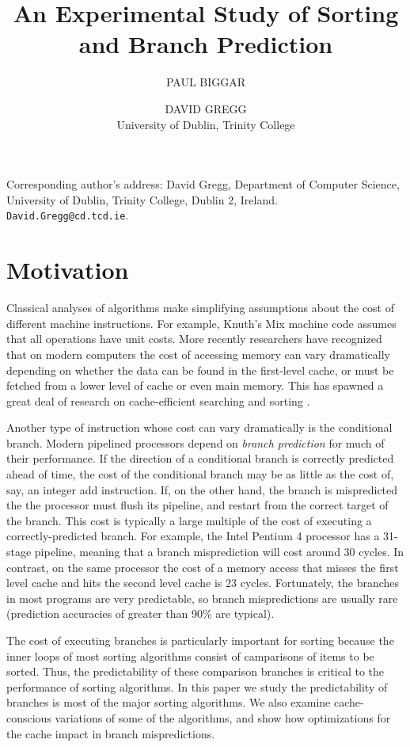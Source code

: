 \documentclass[acmtocl]{acmtrans2m}
\title{An Experimental Study of Sorting and Branch Prediction}
\author{
PAUL BIGGAR
\and
DAVID GREGG
\\University of Dublin, Trinity College
}
\begin{document}
\begin{bottomstuff}
Corresponding author's address: David Gregg, Department of Computer
Science, University of Dublin, Trinity College, Dublin 2, Ireland. {\tt
David.Gregg@cd.tcd.ie}.
\end{bottomstuff}

\maketitle

\section{Motivation}
Classical analyses of algorithms make simplifying assumptions about
the cost of different machine instructions. For example, Knuth's Mix
machine code assumes that all operations have unit costs. More
recently researchers have recognized that on modern computers the cost
of accessing memory can vary dramatically depending on whether the
data can be found in the first-level cache, or must be fetched from a
lower level of cache or even main memory.  This has spawned a great
deal of research on cache-efficient searching and sorting \cite{}.

Another type of instruction whose cost can vary dramatically is the
conditional branch. Modern pipelined processors depend on \emph{branch
prediction} for much of their performance.  If the direction of a
conditional branch is correctly predicted ahead of time, the cost of
the conditional branch may be as little as the cost of, say, an
integer add instruction. If, on the other hand, the branch is
mispredicted the the processor must flush its pipeline, and restart
from the correct target of the branch. This cost is typically a large
multiple of the cost of executing a correctly-predicted branch. For
example, the Intel Pentium 4 processor has a 31-stage pipeline,
meaning that a branch misprediction will cost around 30 cycles.  In
contrast, on the same processor the cost of a memory access that
misses the first level cache and hits the second level cache is 23
cycles. Fortunately, the branches in most programs are very
predictable, so branch mispredictions are usually rare (prediction
accuracies of greater than 90\% are typical).

The cost of executing branches is particularly important for sorting
because the inner loops of most sorting algorithms consist of
camparisons of items to be sorted. Thus, the predictability of
these comparison branches is critical to the performance of
sorting algorithms. In this paper we study the predictability
of branches is most of the major sorting algorithms. We also
examine cache-conscious variations of some of the algorithms,
and show how optimizations for the cache impact in branch
mispredictions.
\end{document}
